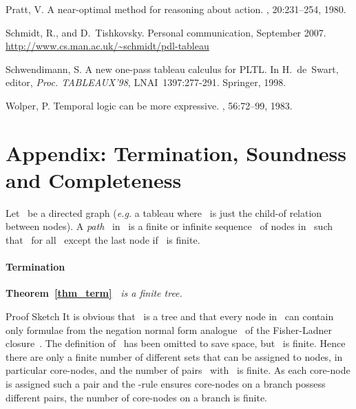 \documentclass{entcs}
\newcommand{\eg}{\emph{e.g.}}
\newcommand{\trea}{}
\begin{document}
\begin{center}
\begin{thebibliography}{10}
  Pratt, V.
  \newblock A near-optimal method for reasoning about action.
  , 20:231--254, 1980.

  Schmidt, R., and D.~Tishkovsky. Personal communication, September 2007.
  \newblock \url{http://www.cs.man.ac.uk/~schmidt/pdl-tableau}

  Schwendimann, S.
  \newblock A new one-pass tableau calculus for {PLTL}.
  \newblock In H.~de~Swart, editor, {\em Proc. TABLEAUX'98}, LNAI~1397:277-291. Springer, 1998.

  Wolper, P.
  \newblock Temporal logic can be more expressive.
  , 56:72--99, 1983.

\end{thebibliography}


\newpage


\section*{Appendix: Termination, Soundness and Completeness}

\begin{definition}
  Let~ be a directed graph
  (\eg{} a tableau
  where~ is just the child-of relation between nodes).
  A \emph{path}~ in~
  is a finite or infinite sequence~ of nodes in~
  such that~ for all~
  except the last node if~ is finite.
\end{definition}

\paragraph{\bf Termination}

\noindent{}\textbf{Theorem~\ref{thm_term}\ }
\emph{ is a finite tree.}
\begin{proof*}{Proof Sketch}
  It is obvious that~ is a tree
  and that every node in~ can contain only formulae
  from the negation normal form analogue~
  of the Fisher-Ladner closure~\cite{fischer-ladner-dynamic}.
  The definition of~ has been omitted to save space,
  but~ is finite.
  Hence there are only a finite number of different sets
  that can be assigned to nodes,
  in particular core-nodes,
  and the number of pairs~
  with~ is finite.
  As each core-node is assigned such a pair
  and the \trea{}-rule ensures
  core-nodes on a branch possess different pairs,
  the number of core-nodes on a branch is finite.


\end{proof*}
\end{center}
\end{document}

